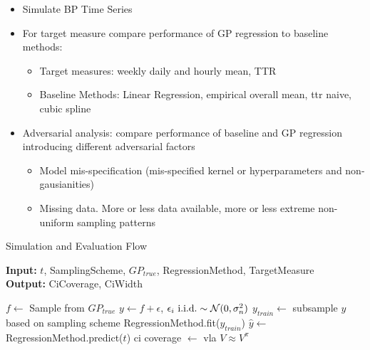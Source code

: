 	\begin{itemize}
		\item Simulate BP Time Series
	\end{itemize}

	\bigskip %

	\begin{itemize}
		\item For target measure compare performance of GP regression to baseline methods:
		\begin{itemize}
			\item Target measures: weekly daily and hourly mean, TTR
			\item Baseline Methods: Linear Regression, empirical overall mean, ttr naive, cubic spline
		\end{itemize}
	\end{itemize}

	\bigskip %

	\begin{itemize}
		\item Adversarial analysis: compare performance of baseline and GP regression introducing different adversarial
		factors
		\begin{itemize}
			\item Model mis-specification (mis-specified kernel or hyperparameters and non-gausianities)
			\item Missing data. More or less data available, more or less extreme non-uniform sampling patterns
		\end{itemize}

	\end{itemize}




\begin{algorithm} \caption{Simulation and Evaluation Flow}
 \hspace*{\algorithmicindent} \textbf{Input:} $t$, SamplingScheme, $GP_{true}$,
RegressionMethod, TargetMeasure\\
 \hspace*{\algorithmicindent} \textbf{Output:} CiCoverage, CiWidth
\begin{algorithmic}[1]

        \State $f \gets$ Sample from $GP_{true}$
        \State $y \gets f + \epsilon$, $\epsilon_i \text{ i.i.d.} \sim \operatorname{\mathcal{N}}(0, \sigma_n^2)$
        \State $y_{train} \gets$ subsample $y$ based on sampling scheme
        \State RegressionMethod.fit($y_{train} $)
        \State $\hat{y} \gets$ RegressionMethod.predict($t$)
        \State ci coverage $\gets$ vla
        \EndFor
    \Ensure $V \approx V^\pi$
\end{algorithmic}
\end{algorithm}


